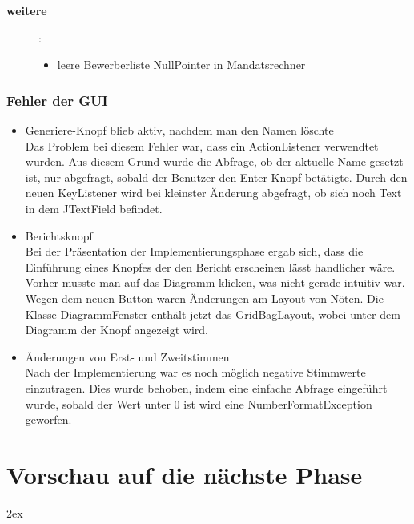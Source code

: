 \documentclass[12pt,a4paper,titlepage]{article}
\begin{document}
\begin{description}
\begin{itemize}
	
\end{itemize}

\item[\textbf {weitere}]:
\begin{itemize}
\item leere Bewerberliste 
NullPointer in Mandatsrechner
\end{itemize}

\end{description}

\subsubsection{Fehler der GUI}
\begin{itemize}
\item Generiere-Knopf blieb aktiv, nachdem man den Namen löschte \\
Das Problem bei diesem Fehler war, dass ein ActionListener verwendtet wurden. Aus diesem Grund wurde die
Abfrage, ob der aktuelle Name gesetzt ist, nur abgefragt, sobald der Benutzer den Enter-Knopf betätigte.
Durch den neuen KeyListener wird bei kleinster Änderung abgefragt, ob sich noch Text in dem JTextField befindet. \\

\item Berichtsknopf \\
Bei der Präsentation der Implementierungsphase ergab sich, dass die Einführung eines Knopfes der den Bericht erscheinen
lässt handlicher wäre. Vorher musste man auf das Diagramm klicken, was nicht gerade intuitiv war. \\
Wegen dem neuen Button waren Änderungen am Layout von Nöten. Die Klasse DiagrammFenster enthält jetzt das GridBagLayout,
wobei unter dem Diagramm der Knopf angezeigt wird. \\

\item Änderungen von Erst- und Zweitstimmen \\
Nach der Implementierung war es noch möglich negative Stimmwerte einzutragen. Dies wurde behoben, indem eine einfache Abfrage eingeführt wurde, sobald der Wert unter 0 ist wird eine NumberFormatException geworfen. \\

\end{itemize}
	
\section{Vorschau auf die nächste Phase}


\begingroup
\parindent 0pt
\parskip 2ex
\def\enotesize{\normalsize}

\endgroup
\end{document}
